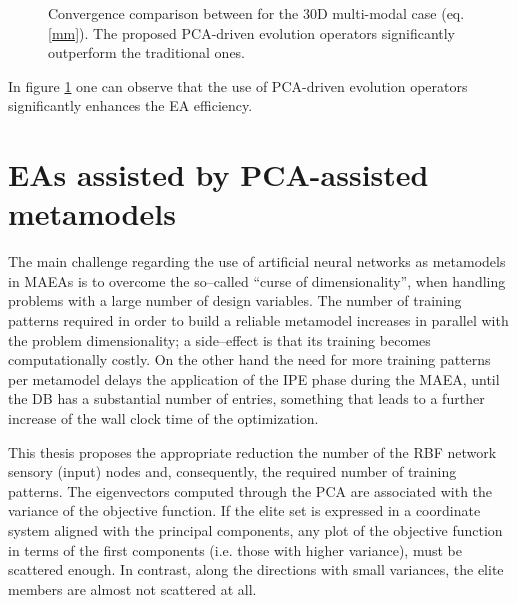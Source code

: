 \begin{figure}[h!]
\begin{minipage}[b]{1\linewidth}
 \centering
\end{minipage}
\caption{Convergence comparison between for the 30D multi-modal case (eq. \ref{mm}). The proposed PCA-driven evolution operators significantly outperform the traditional ones.} 
\label{mmt3}
\end{figure}

In figure \ref{mmt3} one can observe that the use of PCA-driven evolution operators significantly enhances the EA efficiency.

\FloatBarrier
\section{EAs assisted by PCA-assisted metamodels}
The main challenge regarding the use of artificial neural networks as metamodels in MAEAs is to overcome the so--called ``curse of dimensionality'', when handling problems with a large number of design variables. 
The number of training patterns required in order to build a reliable metamodel increases in parallel with the problem dimensionality; a side--effect is that its training becomes computationally costly. On the other hand the need for more training patterns per metamodel delays the application of the IPE phase during the MAEA, until the DB has a substantial number of entries, something that leads to a further increase of the wall clock time of the optimization.

This thesis proposes the appropriate reduction the number of the RBF network sensory (input) nodes and, consequently, the required number of training patterns. The eigenvectors computed through the PCA are associated with the variance of the objective function. 
If the elite set is expressed in a coordinate system aligned with the principal components, any plot of the objective function in terms of the first components (i.e. those with higher variance), must be scattered enough. In contrast, along the directions with small variances, the elite members are almost not scattered at all. 

